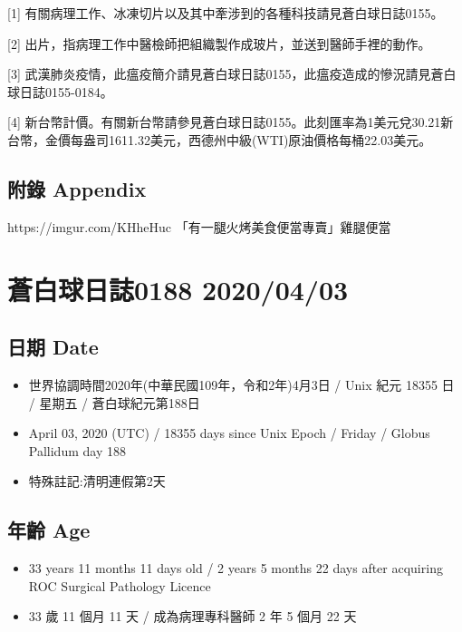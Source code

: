 \documentclass[a5paper, 11pt
]{book}
\providecommand{\tightlist}{%
  \setlength{\itemsep}{0pt}\setlength{\parskip}{0pt}}
\begin{document}
{[}1{]}
有關病理工作、冰凍切片以及其中牽涉到的各種科技請見蒼白球日誌0155。

{[}2{]} 出片，指病理工作中醫檢師把組織製作成玻片，並送到醫師手裡的動作。

{[}3{]}
武漢肺炎疫情，此瘟疫簡介請見蒼白球日誌0155，此瘟疫造成的慘況請見蒼白球日誌0155-0184。

{[}4{]}
新台幣計價。有關新台幣請參見蒼白球日誌0155。此刻匯率為1美元兌30.21新台幣，金價每盎司1611.32美元，西德州中級(WTI)原油價格每桶22.03美元。

\hypertarget{ux9644ux9304-appendix-32}{%
\subsection{附錄 Appendix}\label{ux9644ux9304-appendix-32}}

https://imgur.com/KHheHuc 「有一腿火烤美食便當專賣」雞腿便當

\hypertarget{ux84bcux767dux7403ux65e5ux8a8c0188-20200403}{%
\section{蒼白球日誌0188
2020/04/03}\label{ux84bcux767dux7403ux65e5ux8a8c0188-20200403}}

\hypertarget{ux65e5ux671f-date-33}{%
\subsection{日期 Date}\label{ux65e5ux671f-date-33}}

\begin{itemize}
\tightlist
\item
  世界協調時間2020年(中華民國109年，令和2年)4月3日 / Unix 紀元 18355 日
  / 星期五 / 蒼白球紀元第188日
\item
  April 03, 2020 (UTC) / 18355 days since Unix Epoch / Friday / Globus
  Pallidum day 188
\item
  特殊註記:清明連假第2天
\end{itemize}

\hypertarget{ux5e74ux9f61-age-33}{%
\subsection{年齡 Age}\label{ux5e74ux9f61-age-33}}

\begin{itemize}
\tightlist
\item
  33 years 11 months 11 days old / 2 years 5 months 22 days after
  acquiring ROC Surgical Pathology Licence
\item
  33 歲 11 個月 11 天 / 成為病理專科醫師 2 年 5 個月 22 天
\end{itemize}
\end{document}
